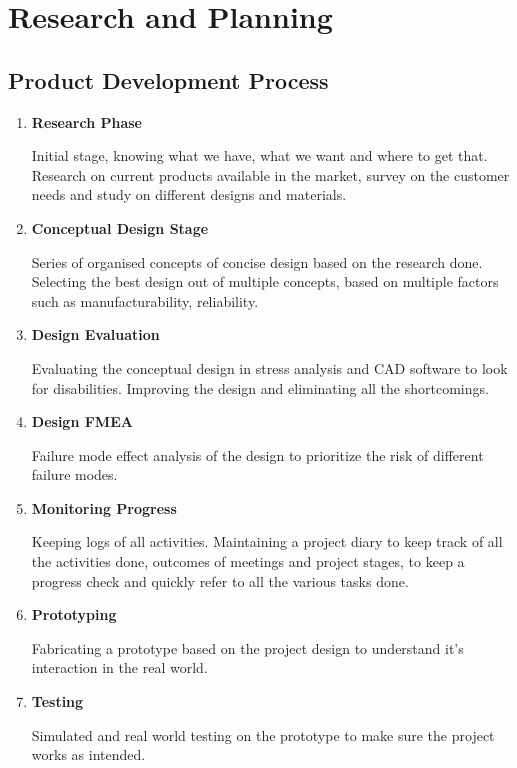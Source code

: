 \chapter{Research and Planning} \label{Research and Planning}

\section{Product Development Process}

\begin{enumerate}
    \item \textbf{Research Phase}
    
           \noindent Initial stage, knowing what we have, what we want           and where to get that. Research on current products available in the market, survey on the customer needs and study on different designs and materials.
          
    \item \textbf{Conceptual Design Stage}
    
           \noindent Series of organised concepts of concise design              based on the research done. Selecting the best design out of multiple concepts, based on multiple factors such as manufacturability, reliability.
           
    \item \textbf{Design Evaluation}
    
           \noindent Evaluating the conceptual design in stress         analysis and CAD software to look for disabilities. Improving the design and eliminating all the shortcomings.
           
    \item \textbf{Design FMEA}
    
            \noindent Failure mode effect analysis of the design to prioritize the risk of different failure modes.
            
    \item \textbf{Monitoring Progress}
    
           \noindent Keeping logs of all activities. Maintaining a project diary to keep track of all the activities done, outcomes of meetings and project stages, to keep a progress check and quickly refer to all the various tasks done.
           
    \item \textbf{Prototyping}
     
           \noindent Fabricating a prototype based on the project design to understand it's interaction in the real world.
           
    \item \textbf{Testing}
    
           \noindent Simulated and real world testing on the prototype to make sure the project works as intended.
           
\end{enumerate}
\pagebreak

